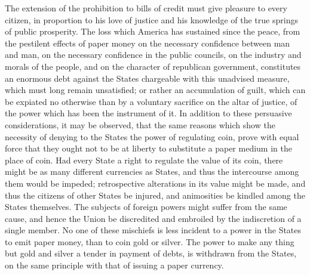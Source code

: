 The extension of the prohibition to bills of credit must give pleasure to every citizen, in proportion to his love of justice and his knowledge of the true springs of public prosperity. The loss which America has sustained since the peace, from the pestilent effects of paper money on the necessary confidence between man and man, on the necessary confidence in the public councils, on the industry and morals of the people, and on the character of republican government, constitutes an enormous debt against the States chargeable with this unadvised measure, which must long remain unsatisfied; or rather an accumulation of guilt, which can be expiated no otherwise than by a voluntary sacrifice on the altar of justice, of the power which has been the instrument of it. In addition to these persuasive considerations, it may be observed, that the same reasons which show the necessity of denying to the States the power of regulating coin, prove with equal force that they ought not to be at liberty to substitute a paper medium in the place of coin. Had every State a right to regulate the value of its coin, there might be as many different currencies as States, and thus the intercourse among them would be impeded; retrospective alterations in its value might be made, and thus the citizens of other States be injured, and animosities be kindled among the States themselves. The subjects of foreign powers might suffer from the same cause, and hence the Union be discredited and embroiled by the indiscretion of a single member. No one of these mischiefs is less incident to a power in the States to emit paper money, than to coin gold or silver. The power to make any thing but gold and silver a tender in payment of debts, is withdrawn from the States, on the same principle with that of issuing a paper currency.

